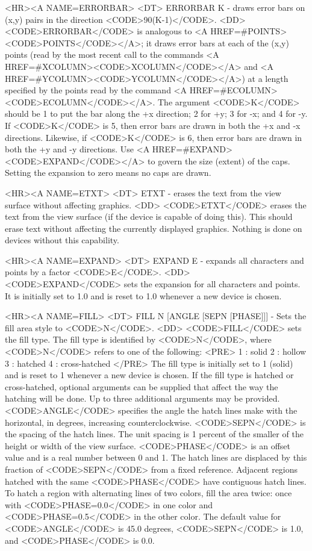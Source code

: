 \begin{rawhtml}
<HR><A NAME=ERRORBAR>
<DT>
ERRORBAR K - draws error bars on (x,y) pairs in the direction <CODE>90(K-1)</CODE>.
<DD>
	<CODE>ERRORBAR</CODE> is analogous to
	<A HREF=#POINTS><CODE>POINTS</CODE></A>; it draws error bars at
	each of the (x,y) points (read by the most recent call to the
	commands <A HREF=#XCOLUMN><CODE>XCOLUMN</CODE></A> and
	<A HREF=#YCOLUMN><CODE>YCOLUMN</CODE></A>) at a length specified
	by the points read by the command
	<A HREF=#ECOLUMN><CODE>ECOLUMN</CODE></A>.  The argument <CODE>K</CODE>
	should be 1 to put the bar along the +x direction; 2 for +y;
	3 for -x; and 4 for -y.  If <CODE>K</CODE> is 5, then error bars
	are drawn in both the +x and -x directions.
	Likewise, if <CODE>K</CODE> is 6, then error bars
	are drawn in both the +y and -y directions.
	Use <A HREF=#EXPAND><CODE>EXPAND</CODE></A>
	to govern the size (extent) of the caps.
	Setting the expansion to zero means no caps are drawn.

<HR><A NAME=ETXT>
<DT>
ETXT - erases the text from the view surface without affecting graphics.
<DD>
	<CODE>ETXT</CODE> erases the text from the view surface (if the
	device is capable of doing this).  This should erase text without
	affecting the currently displayed graphics.  Nothing is done on
	devices without this capability.

<HR><A NAME=EXPAND>
<DT>
EXPAND E - expands all characters and points by a factor <CODE>E</CODE>.
<DD>
	<CODE>EXPAND</CODE> sets the expansion for all characters and points.
	It is initially set to 1.0 and is reset to 1.0 whenever
	a new device is chosen. 

<HR><A NAME=FILL>
<DT>
FILL N [ANGLE [SEPN [PHASE]]] - Sets the fill area style to <CODE>N</CODE>.
<DD>
	<CODE>FILL</CODE> sets the fill type.  The fill type is
	identified by <CODE>N</CODE>, where <CODE>N</CODE> refers to
	one of the following:
	<PRE>
    1 : solid
    2 : hollow
    3 : hatched
    4 : cross-hatched
	</PRE>
	The fill type is initially set to 1 (solid) and is reset to 1
	whenever a new device is chosen.  If the fill type is hatched or
	cross-hatched, optional arguments can be supplied that affect
	the way the hatching will be done.  Up to three additional
	arguments may be provided.  <CODE>ANGLE</CODE> specifies the
	angle the hatch lines make with the horizontal, in degrees,
	increasing counterclockwise.  <CODE>SEPN</CODE> is the spacing
	of the hatch lines.  The unit spacing is 1 percent of the smaller
	of the height or width of the view surface.  <CODE>PHASE</CODE>
	is an offset value and is a real number between 0 and 1.  The
	hatch lines are displaced by this fraction of <CODE>SEPN</CODE>
	from a fixed reference.  Adjacent regions hatched with the
	same <CODE>PHASE</CODE> have contiguous hatch lines.  To hatch
	a region with alternating lines of two colors, fill the area
	twice: once with <CODE>PHASE=0.0</CODE> in one color and
	<CODE>PHASE=0.5</CODE> in the other color.  The default value
	for <CODE>ANGLE</CODE> is 45.0 degrees, <CODE>SEPN</CODE> is 1.0,
	and <CODE>PHASE</CODE> is 0.0.


\end{rawhtml}
